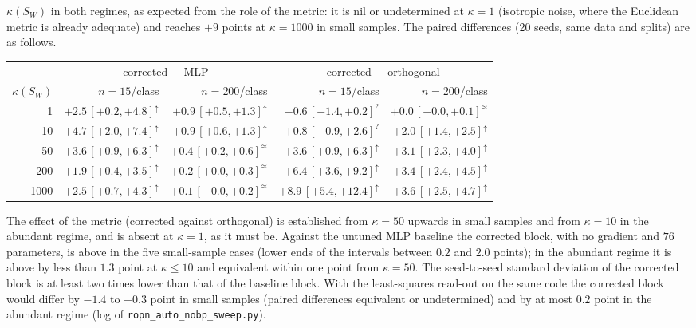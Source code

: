 \documentclass[11pt,a4paper]{article}
\theoremstyle{plain}
\theoremstyle{definition}
\theoremstyle{remark}
\begin{document}
$\kappa(S_W)$ in both regimes, as expected from the role of the metric: it
is nil or undetermined at $\kappa=1$ (isotropic noise, where the Euclidean
metric is already adequate) and reaches $+9$ points at $\kappa=1000$ in
small samples. The paired
differences (20 seeds, same data and splits) are as follows.
\begin{center}\small
\begin{tabular}{@{}rrrrr@{}}
\toprule
 & \multicolumn{2}{c}{corrected $-$ MLP} & \multicolumn{2}{c}{corrected $-$ orthogonal} \\
$\kappa(S_W)$ & $n=15$/class & $n=200$/class & $n=15$/class & $n=200$/class \\
\midrule
1 & $+2.5\,[+0.2,+4.8]^{\uparrow}$ & $+0.9\,[+0.5,+1.3]^{\uparrow}$ & $-0.6\,[-1.4,+0.2]^{?}$ & $+0.0\,[-0.0,+0.1]^{\approx}$ \\
10 & $+4.7\,[+2.0,+7.4]^{\uparrow}$ & $+0.9\,[+0.6,+1.3]^{\uparrow}$ & $+0.8\,[-0.9,+2.6]^{?}$ & $+2.0\,[+1.4,+2.5]^{\uparrow}$ \\
50 & $+3.6\,[+0.9,+6.3]^{\uparrow}$ & $+0.4\,[+0.2,+0.6]^{\approx}$ & $+3.6\,[+0.9,+6.3]^{\uparrow}$ & $+3.1\,[+2.3,+4.0]^{\uparrow}$ \\
200 & $+1.9\,[+0.4,+3.5]^{\uparrow}$ & $+0.2\,[+0.0,+0.3]^{\approx}$ & $+6.4\,[+3.6,+9.2]^{\uparrow}$ & $+3.4\,[+2.4,+4.5]^{\uparrow}$ \\
1000 & $+2.5\,[+0.7,+4.3]^{\uparrow}$ & $+0.1\,[-0.0,+0.2]^{\approx}$ & $+8.9\,[+5.4,+12.4]^{\uparrow}$ & $+3.6\,[+2.5,+4.7]^{\uparrow}$ \\
\bottomrule
\end{tabular}
\end{center}
The effect of the metric (corrected against orthogonal) is established
from $\kappa=50$ upwards in small samples and from $\kappa=10$ in the
abundant regime, and is absent at $\kappa=1$, as it must be. Against the
untuned MLP baseline the corrected block, with no gradient and $76$
parameters, is above in the five small-sample cases (lower ends of the
intervals between $0.2$ and $2.0$ points); in the abundant regime it is
above by less than $1.3$ point at $\kappa\le10$ and equivalent within one
point from $\kappa=50$. The seed-to-seed standard deviation of the
corrected block is at least two times lower than that of the baseline
block. With the least-squares read-out on the same code the corrected
block would differ by $-1.4$ to $+0.3$ point in small samples (paired
differences equivalent or undetermined) and by at most $0.2$ point in the
abundant regime (log of \texttt{ropn\_auto\_nobp\_sweep.py}).
\end{document}
